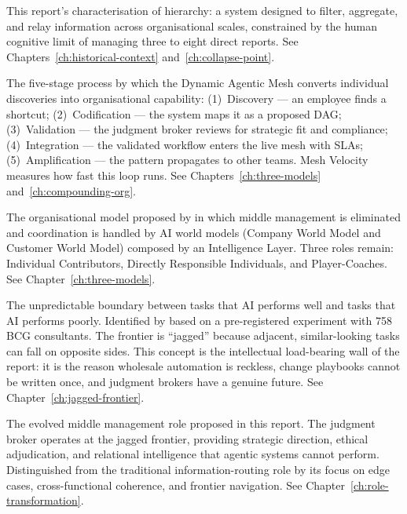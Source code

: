 \begin{description}[style=nextline, leftmargin=2em, font=\bfseries\color{navyblue}]
\item[Information Routing Protocol]
This report's characterisation of hierarchy: a system designed to filter, aggregate, and relay information across organisational scales, constrained by the human cognitive limit of managing three to eight direct reports. See Chapters~\ref{ch:historical-context} and~\ref{ch:collapse-point}.

\item[Insight Ingestion Loop]
The five-stage process by which the Dynamic Agentic Mesh converts individual discoveries into organisational capability: (1)~Discovery --- an employee finds a shortcut; (2)~Codification --- the system maps it as a proposed DAG; (3)~Validation --- the judgment broker reviews for strategic fit and compliance; (4)~Integration --- the validated workflow enters the live mesh with SLAs; (5)~Amplification --- the pattern propagates to other teams. Mesh Velocity measures how fast this loop runs. See Chapters~\ref{ch:three-models} and~\ref{ch:compounding-org}.

\item[Intelligence Layer]
The organisational model proposed by \textcite{DorseyBotha2026} in which middle management is eliminated and coordination is handled by AI world models (Company World Model and Customer World Model) composed by an Intelligence Layer. Three roles remain: Individual Contributors, Directly Responsible Individuals, and Player-Coaches. See Chapter~\ref{ch:three-models}.

\item[Jagged Frontier]
The unpredictable boundary between tasks that AI performs well and tasks that AI performs poorly. Identified by \textcite{DellAcqua2026} based on a pre-registered experiment with 758 BCG consultants. The frontier is ``jagged'' because adjacent, similar-looking tasks can fall on opposite sides. This concept is the intellectual load-bearing wall of the report: it is the reason wholesale automation is reckless, change playbooks cannot be written once, and judgment brokers have a genuine future. See Chapter~\ref{ch:jagged-frontier}.

\item[Judgment Broker]
The evolved middle management role proposed in this report. The judgment broker operates at the jagged frontier, providing strategic direction, ethical adjudication, and relational intelligence that agentic systems cannot perform. Distinguished from the traditional information-routing role by its focus on edge cases, cross-functional coherence, and frontier navigation. See Chapter~\ref{ch:role-transformation}.


\end{description}
